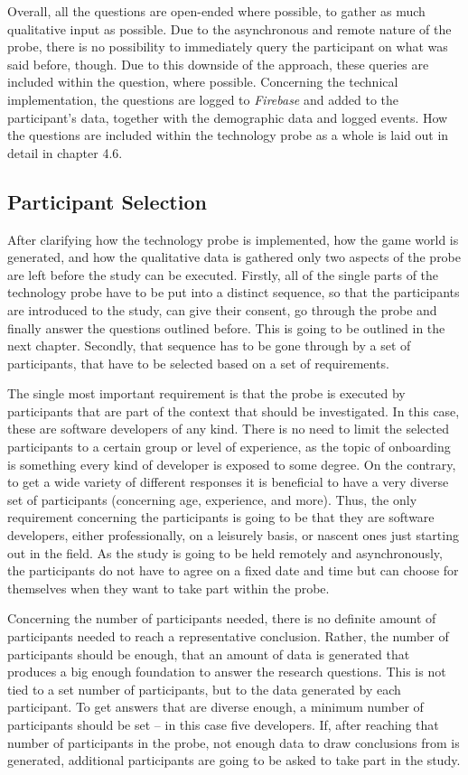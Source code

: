 Overall, all the questions are open-ended where possible, to gather as much qualitative input as possible. Due to the asynchronous and remote nature of the probe, there is no possibility to immediately query the participant on what was said before, though. Due to this downside of the approach, these queries are included within the question, where possible. Concerning the technical implementation, the questions are logged to \textit{Firebase} and added to the participant's data, together with the demographic data and logged events. How the questions are included within the technology probe as a whole is laid out in detail in chapter 4.6.

\subsection{Participant Selection}

After clarifying how the technology probe is implemented, how the game world is generated, and how the qualitative data is gathered only two aspects of the probe are left before the study can be executed. Firstly, all of the single parts of the technology probe have to be put into a distinct sequence, so that the participants are introduced to the study, can give their consent, go through the probe and finally answer the questions outlined before. This is going to be outlined in the next chapter. Secondly, that sequence has to be gone through by a set of participants, that have to be selected based on a set of requirements.

The single most important requirement is that the probe is executed by participants that are part of the context that should be investigated. In this case, these are software developers of any kind. There is no need to limit the selected participants to a certain group or level of experience, as the topic of onboarding is something every kind of developer is exposed to some degree. On the contrary, to get a wide variety of different responses it is beneficial to have a very diverse set of participants (concerning age, experience, and more). Thus, the only requirement concerning the participants is going to be that they are software developers, either professionally, on a leisurely basis, or nascent ones just starting out in the field. As the study is going to be held remotely and asynchronously, the participants do not have to agree on a fixed date and time but can choose for themselves when they want to take part within the probe.

Concerning the number of participants needed, there is no definite amount of participants needed to reach a representative conclusion. Rather, the number of participants should be enough, that an amount of data is generated that produces a big enough foundation to answer the research questions. This is not tied to a set number of participants, but to the data generated by each participant. To get answers that are diverse enough, a minimum number of participants should be set -- in this case five developers. If, after reaching that number of participants in the probe, not enough data to draw conclusions from is generated, additional participants are going to be asked to take part in the study.

